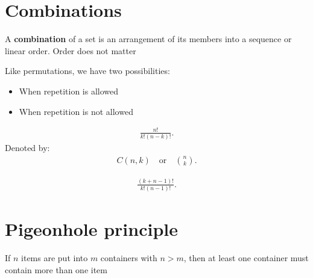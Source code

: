 \documentclass{report}
\begin{document}
    \section{\LARGE Combinations}
    \bigbreak \noindent 
    \smallbreak \noindent
    \begin{definition}
        A \textbf{combination} of a set is an arrangement of its members into  a sequence or linear order. Order does not matter
    \end{definition}
    \bigbreak \noindent 
    Like permutations, we have two possibilities:
    \bigbreak \noindent 
    \begin{itemize}
        \item When repetition is allowed
        \item When repetition is not allowed
    \end{itemize}
    \bigbreak \noindent 
    \begin{thrm}
       \begin{align*}
           \frac{n!}{k!(n-k)!}
       .\end{align*} 
        Denoted by:
        \begin{align*}
            C(n,k) \quad \text{or}\quad \binom{n}{k}
        .\end{align*}
    \end{thrm}
    \bigbreak \noindent 
    \begin{thrm}
       \begin{align*}
           \frac{(k+n-1)!}{k!(n-1)!}
       .\end{align*} 
    \end{thrm}

    \pagebreak \bigbreak \noindent 
    \section{\LARGE Pigeonhole principle}
    \bigbreak \noindent 
    \smallbreak \noindent
    \begin{definition}
        If $n$ items are put into $m$ containers with $ n>m $, then at least one container must contain more than one item 
    \textbf{} 
    \end{definition}

    \pagebreak \bigbreak \noindent 
\end{document}
